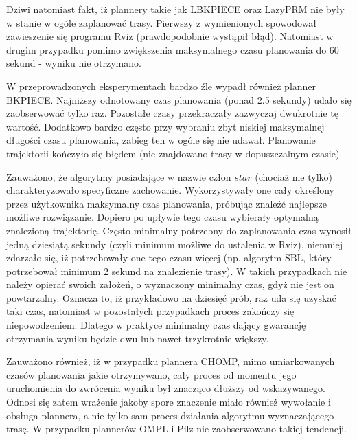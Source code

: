 Dziwi natomiast fakt, iż plannery takie jak LBKPIECE oraz LazyPRM nie były w stanie w ogóle zaplanować trasy. Pierwszy z wymienionych spowodował zawieszenie się programu Rviz (prawdopodobnie wystąpił błąd). Natomiast w drugim przypadku pomimo zwiększenia maksymalnego czasu planowania do 60 sekund - wyniku nie otrzymano.

W przeprowadzonych eksperymentach bardzo źle wypadł również planner BKPIECE. Najniższy odnotowany czas planowania (ponad 2.5 sekundy) udało się zaobserwować tylko raz. Pozostałe czasy przekraczały zazwyczaj dwukrotnie tę wartość. Dodatkowo bardzo często przy wybraniu zbyt niskiej maksymalnej długości czasu planowania, zabieg ten w ogóle się nie udawał. Planowanie trajektorii kończyło się błędem (nie znajdowano trasy w dopuszczalnym czasie). 

Zauważono, że algorytmy posiadające w nazwie człon $star$ (chociaż nie tylko) charakteryzowało specyficzne zachowanie. Wykorzystywały one cały określony przez użytkownika maksymalny czas planowania, próbując znaleźć najlepsze możliwe rozwiązanie. Dopiero po upływie tego czasu wybierały optymalną znalezioną trajektorię. Często minimalny potrzebny do zaplanowania czas wynosił jedną dziesiątą sekundy (czyli minimum możliwe do ustalenia w Rviz), niemniej zdarzało się, iż potrzebowały one tego czasu więcej (np. algorytm SBL, który potrzebował minimum 2 sekund na znalezienie trasy). W takich przypadkach nie należy opierać swoich założeń, o wyznaczony minimalny czas, gdyż nie jest on powtarzalny. Oznacza to, iż przykładowo na dziesięć prób, raz uda się uzyskać taki czas, natomiast w pozostałych przypadkach proces zakończy się niepowodzeniem. Dlatego w praktyce minimalny czas dający gwarancję otrzymania wyniku będzie dwu lub nawet trzykrotnie większy.

Zauważono również, iż w przypadku plannera CHOMP, mimo umiarkowanych czasów planowania jakie otrzymywano, cały proces od momentu jego uruchomienia do zwrócenia wyniku był znacząco dłuższy od wskazywanego. Odnosi się zatem wrażenie jakoby spore znaczenie miało również wywołanie i obsługa plannera, a nie tylko sam proces działania algorytmu wyznaczającego trasę. W przypadku plannerów OMPL i Pilz nie zaobserwowano takiej tendencji.




